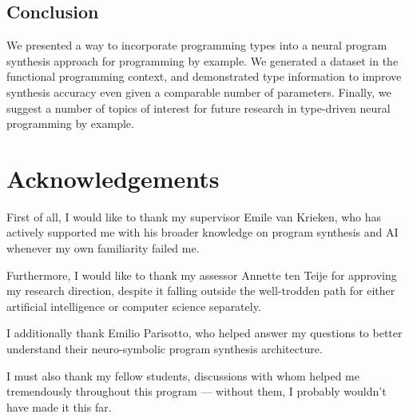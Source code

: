 \documentclass{article}
\begin{document}


\subsection{Conclusion}

We presented a way to incorporate programming types into a neural program synthesis approach for programming by example.
We generated a dataset in the functional programming context,
and demonstrated type information to improve synthesis accuracy even given a comparable number of parameters.
Finally, we suggest a number of topics of interest for future research in type-driven neural programming by example.


\pagebreak

\section{Acknowledgements} %

First of all, I would like to thank my supervisor Emile van Krieken,
who has actively supported me with his broader knowledge on
program synthesis and AI whenever my own familiarity failed me.

Furthermore, I would like to thank my assessor Annette ten Teije for approving
my research direction, despite it falling outside the well-trodden
path for either artificial intelligence or computer science separately.

I additionally thank Emilio Parisotto, who helped answer my questions to better understand their neuro-symbolic program synthesis architecture.~\citep{nsps}

I must also thank my fellow students, discussions with whom helped me
tremendously throughout this program --- without them,
I probably wouldn't have made it this far.
\end{document}

